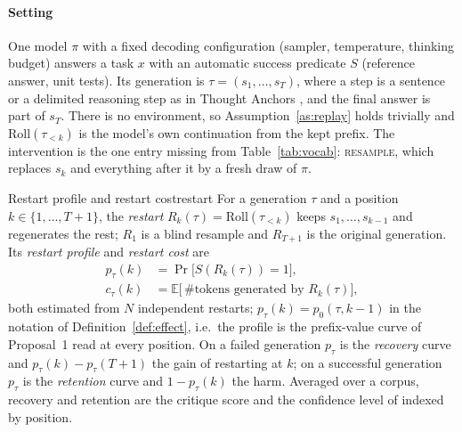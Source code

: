 \documentclass[10pt,a4paper]{article}
\begin{document}
\paragraph{Setting} One model $\pi$ with a fixed decoding configuration (sampler, temperature, thinking budget) answers a task $x$ with an automatic success predicate $S$ (reference answer, unit tests). Its generation is $\tau=(s_1,\dots,s_T)$, where a step is a sentence or a delimited reasoning step as in Thought Anchors \cite{bogdan2025thoughtanchors}, and the final answer is part of $s_T$. There is no environment, so Assumption~\ref{as:replay} holds trivially and $\mathrm{Roll}(\tau_{<k})$ is the model's own continuation from the kept prefix. The intervention is the one entry missing from Table~\ref{tab:vocab}: \textsc{resample}, which replaces $s_k$ and everything after it by a fresh draw of $\pi$.

\begin{definition}{Restart profile and restart cost}{restart}
For a generation $\tau$ and a position $k\in\{1,\dots,T{+}1\}$, the \emph{restart} $R_k(\tau)=\mathrm{Roll}(\tau_{<k})$ keeps $s_1,\dots,s_{k-1}$ and regenerates the rest; $R_1$ is a blind resample and $R_{T+1}$ is the original generation. Its \emph{restart profile} and \emph{restart cost} are
\begin{align*}
p_\tau(k)&=\Pr\big[S(R_k(\tau))=1\big],\\
c_\tau(k)&=\mathbb{E}\big[\,\#\text{tokens generated by }R_k(\tau)\big],
\end{align*}
both estimated from $N$ independent restarts; $p_\tau(k)=p_0(\tau,k{-}1)$ in the notation of Definition~\ref{def:effect}, i.e.\ the profile is the prefix-value curve of Proposal~1 read at every position. On a failed generation $p_\tau$ is the \emph{recovery} curve and $p_\tau(k)-p_\tau(T{+}1)$ the gain of restarting at $k$; on a successful generation $p_\tau$ is the \emph{retention} curve and $1-p_\tau(k)$ the harm. Averaged over a corpus, recovery and retention are the critique score and the confidence level of \citet{yang2024confcrit} indexed by position.
\end{definition}
\end{document}
